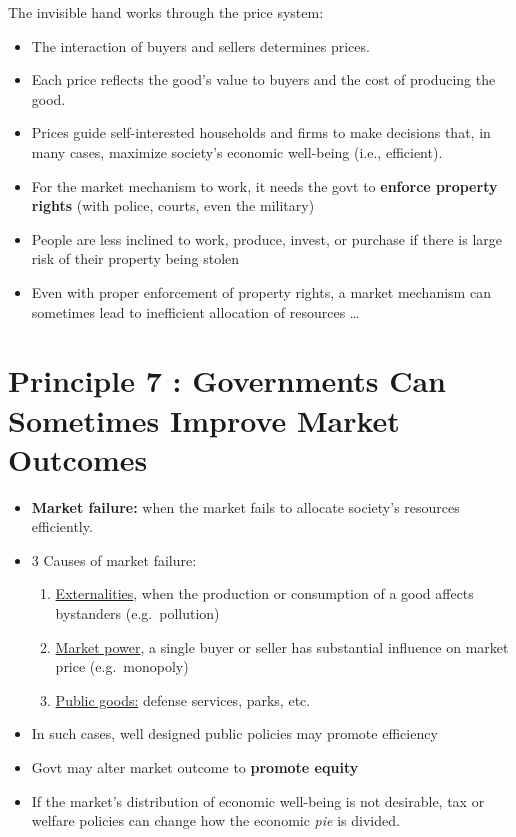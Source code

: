 \documentclass[
]{book}
\begin{document}
The invisible hand works through the price system:

\begin{itemize}
\item
  The interaction of buyers and sellers determines prices.
\item
  Each price reflects the good's value to buyers and the cost of producing the good.
\item
  Prices guide self-interested households and firms to make decisions that, in many cases, maximize society's economic well-being (i.e., efficient).
\item
  For the market mechanism to work, it needs the govt to \textbf{enforce property rights} (with police, courts, even the military)
\item
  People are less inclined to work, produce, invest, or purchase if there is large risk of their property being stolen
\item
  Even with proper enforcement of property rights, a market mechanism can sometimes lead to inefficient allocation of resources \ldots
\end{itemize}

\hypertarget{principle-7-governments-can-sometimes-improve-market-outcomes}{%
\section{Principle 7 : Governments Can Sometimes Improve Market Outcomes}\label{principle-7-governments-can-sometimes-improve-market-outcomes}}

\begin{itemize}
\item
  \textbf{Market failure:} when the market fails to allocate society's resources efficiently.
\item
  3 Causes of market failure:

  \begin{enumerate}
  \def\labelenumi{\arabic{enumi}.}
  \item
    \underline{Externalities}, when the production or consumption of a good affects bystanders (e.g.~pollution)
  \item
    \underline{Market power}, a single buyer or seller has substantial influence on market price (e.g.~monopoly)
  \item
    \underline{Public goods:} defense services, parks, etc.
  \end{enumerate}
\item
  In such cases, well designed public policies may promote efficiency
\item
  Govt may alter market outcome to \textbf{promote equity}
\item
  If the market's distribution of economic well-being is not desirable, tax or welfare policies can change how the economic \emph{pie} is divided.
\end{itemize}
\end{document}

